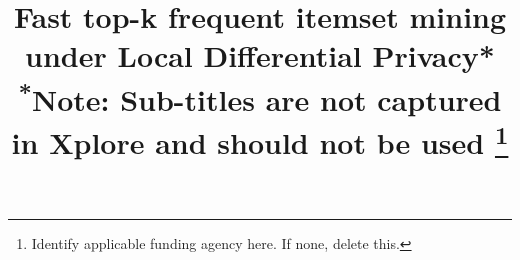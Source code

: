 \documentclass[conference]{IEEEtran}
\begin{document}
\title{Fast top-k frequent itemset mining under Local Differential Privacy*\\
{\footnotesize \textsuperscript{*}Note: Sub-titles are not captured in Xplore and
should not be used}
\thanks{Identify applicable funding agency here. If none, delete this.}
}

\author{
}

\maketitle
\end{document}
